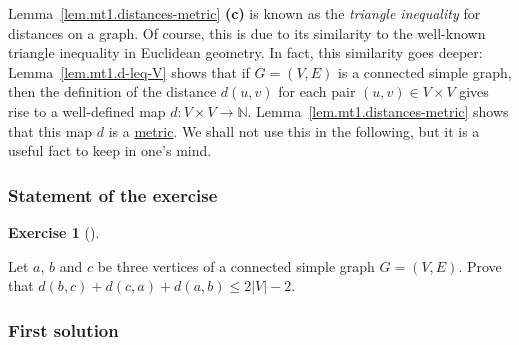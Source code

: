 \documentclass[numbers=enddot,12pt,final,onecolumn,notitlepage]{scrartcl}%
\newcounter{exer}
\theoremstyle{definition}
\newtheorem{exmp}[exer]{Exercise}
\newenvironment{exercise}[1][]
{\begin{exmp}[#1]\begin{leftbar}}
{\end{leftbar}\end{exmp}}
\newcommand{\NN}{\mathbb{N}}
\newcommand{\abs}[1]{\left| #1 \right|}
\newcommand{\tup}[1]{\left( #1 \right)}
\begin{document}
Lemma~\ref{lem.mt1.distances-metric} \textbf{(c)} is known as the
\textit{triangle inequality} for distances on a graph.
Of course, this is due to its similarity to the well-known triangle
inequality in Euclidean geometry. In fact, this similarity goes
deeper:
Lemma~\ref{lem.mt1.d-leq-V} shows that if $G = \tup{V, E}$ is a
connected simple graph, then the definition of the distance
$d \tup{u, v}$ for each pair $\tup{u, v} \in V \times V$ gives rise
to a well-defined map $d : V \times V \to \NN$.
Lemma~\ref{lem.mt1.distances-metric} shows that this map $d$ is a
\href{https://en.wikipedia.org/wiki/Metric_(mathematics)}{metric}.
We shall not use this in the following, but it is a useful fact to
keep in one's mind.

\subsubsection{Statement of the exercise}

\begin{exercise} \label{exe.mt1.d+d+d}
Let $a$, $b$ and $c$ be three vertices of a connected simple graph
$G = \tup{V, E}$.
Prove that
$d \tup{b, c} + d \tup{c, a} + d \tup{a, b} \leq 2 \abs{V} - 2$.
\end{exercise}

\subsubsection{First solution}
\end{document}
